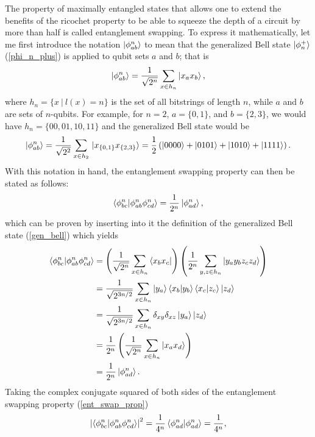 \documentclass[Dual]{msu-thesis}
\begin{document}
The property of maximally entangled states that allows one to extend the benefits of the ricochet property to be able to squeeze the depth of a circuit by more than half is called entanglement swapping. To express it mathematically, let me first introduce the notation $\ket{\phi^n_{ab}}$ to mean that the generalized Bell state $\ket{\phi_n^+}$ (\ref{phi_n_plus}) is applied to qubit sets $a$ and $b$; that is
\begin{align}
\label{gen_bell}
\ket{\phi^n_{ab}}=\frac{1}{\sqrt{2^n}}\sum_{x\in h_n}\ket{x_ax_b}
,\end{align}
where $h_n=\{x \ | \ l(x)=n\}$ is the set of all bitstrings of length $n$, while $a$ and $b$ are sets of $n$-qubits. For example, for $n=2$, $a=\{0,1\}$, and $b=\{2,3\}$, we would have $h_n=\{00,01,10,11\}$ and the generalized Bell state would be
\begin{align}
\ket{\phi^n_{ab}}
=
\frac{1}{\sqrt{2^2}}\sum_{x\in h_2}\ket*{x_{\{0,1\}}x_{\{2,3\}}}
=
\frac{1}{2}
\left(
\ket{0000}+\ket{0101}+\ket{1010}+\ket{1111}
\right)
.\end{align}
With this notation in hand, the entanglement swapping property can then be stated as follows:
\begin{align}
\label{ent_swap_prop}
\bra{\phi^n_{bc}}\ket{\phi^n_{ab}\phi^n_{cd}}
=
\frac{1}{2^n}
\ket{\phi^n_{ad}}
,\end{align}
which can be proven by inserting into it the definition of the generalized Bell state (\ref{gen_bell}) which yields
\begin{align}
\bra{\phi^n_{bc}}\ket{\phi^n_{ab}\phi^n_{cd}}
&=
\left(
\frac{1}{\sqrt{2^n}}\sum_{x\in h_n}\bra{x_bx_c}
\right)
\left(
\frac{1}{2^n}\sum_{y,z\in h_n}\ket{y_ay_bz_cz_d}
\right)
\\
&=
\frac{1}{\sqrt{2^{3n/2}}}
\sum_{x\in h_n}
\ket{y_a}\bra{x_b}\ket{y_b}\bra{x_c}\ket{z_c}\ket{z_d}
\nonumber
\\
&=
\frac{1}{\sqrt{2^{3n/2}}}
\sum_{x\in h_n}
\delta_{xy}\delta_{xz}
\ket{y_a}\ket{z_d}
\nonumber
\\
&=
\frac{1}{2^n}
\left(
\frac{1}{\sqrt{2^n}}
\sum_{x\in h_n}
\ket{x_ax_d}
\right)
\nonumber
\\
&=
\frac{1}{2^n}
\ket{\phi^n_{ad}}
.\end{align}
Taking the complex conjugate squared of both sides of the entanglement swapping property (\ref{ent_swap_prop}) 
\begin{align}
\abs{\bra{\phi^n_{bc}}\ket{\phi^n_{ab}\phi^n_{cd}}}^2
=
\frac{1}{4^n}
\bra{\phi^n_{ad}}\ket{\phi^n_{ad}}
=
\frac{1}{4^n}
,\end{align}
\end{document}
